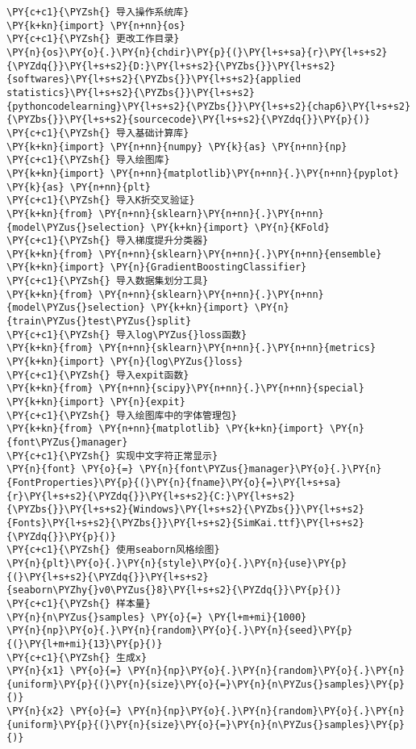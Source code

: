 \begin{Verbatim}[commandchars=\\\{\}]
\PY{c+c1}{\PYZsh{} 导入操作系统库}
\PY{k+kn}{import} \PY{n+nn}{os}
\PY{c+c1}{\PYZsh{} 更改工作目录}
\PY{n}{os}\PY{o}{.}\PY{n}{chdir}\PY{p}{(}\PY{l+s+sa}{r}\PY{l+s+s2}{\PYZdq{}}\PY{l+s+s2}{D:}\PY{l+s+s2}{\PYZbs{}}\PY{l+s+s2}{softwares}\PY{l+s+s2}{\PYZbs{}}\PY{l+s+s2}{applied statistics}\PY{l+s+s2}{\PYZbs{}}\PY{l+s+s2}{pythoncodelearning}\PY{l+s+s2}{\PYZbs{}}\PY{l+s+s2}{chap6}\PY{l+s+s2}{\PYZbs{}}\PY{l+s+s2}{sourcecode}\PY{l+s+s2}{\PYZdq{}}\PY{p}{)}
\PY{c+c1}{\PYZsh{} 导入基础计算库}
\PY{k+kn}{import} \PY{n+nn}{numpy} \PY{k}{as} \PY{n+nn}{np}
\PY{c+c1}{\PYZsh{} 导入绘图库}
\PY{k+kn}{import} \PY{n+nn}{matplotlib}\PY{n+nn}{.}\PY{n+nn}{pyplot} \PY{k}{as} \PY{n+nn}{plt}
\PY{c+c1}{\PYZsh{} 导入K折交叉验证}
\PY{k+kn}{from} \PY{n+nn}{sklearn}\PY{n+nn}{.}\PY{n+nn}{model\PYZus{}selection} \PY{k+kn}{import} \PY{n}{KFold}
\PY{c+c1}{\PYZsh{} 导入梯度提升分类器}
\PY{k+kn}{from} \PY{n+nn}{sklearn}\PY{n+nn}{.}\PY{n+nn}{ensemble} \PY{k+kn}{import} \PY{n}{GradientBoostingClassifier}
\PY{c+c1}{\PYZsh{} 导入数据集划分工具}
\PY{k+kn}{from} \PY{n+nn}{sklearn}\PY{n+nn}{.}\PY{n+nn}{model\PYZus{}selection} \PY{k+kn}{import} \PY{n}{train\PYZus{}test\PYZus{}split}
\PY{c+c1}{\PYZsh{} 导入log\PYZus{}loss函数}
\PY{k+kn}{from} \PY{n+nn}{sklearn}\PY{n+nn}{.}\PY{n+nn}{metrics} \PY{k+kn}{import} \PY{n}{log\PYZus{}loss}
\PY{c+c1}{\PYZsh{} 导入expit函数}
\PY{k+kn}{from} \PY{n+nn}{scipy}\PY{n+nn}{.}\PY{n+nn}{special} \PY{k+kn}{import} \PY{n}{expit}
\PY{c+c1}{\PYZsh{} 导入绘图库中的字体管理包}
\PY{k+kn}{from} \PY{n+nn}{matplotlib} \PY{k+kn}{import} \PY{n}{font\PYZus{}manager}
\PY{c+c1}{\PYZsh{} 实现中文字符正常显示}
\PY{n}{font} \PY{o}{=} \PY{n}{font\PYZus{}manager}\PY{o}{.}\PY{n}{FontProperties}\PY{p}{(}\PY{n}{fname}\PY{o}{=}\PY{l+s+sa}{r}\PY{l+s+s2}{\PYZdq{}}\PY{l+s+s2}{C:}\PY{l+s+s2}{\PYZbs{}}\PY{l+s+s2}{Windows}\PY{l+s+s2}{\PYZbs{}}\PY{l+s+s2}{Fonts}\PY{l+s+s2}{\PYZbs{}}\PY{l+s+s2}{SimKai.ttf}\PY{l+s+s2}{\PYZdq{}}\PY{p}{)}
\PY{c+c1}{\PYZsh{} 使用seaborn风格绘图}
\PY{n}{plt}\PY{o}{.}\PY{n}{style}\PY{o}{.}\PY{n}{use}\PY{p}{(}\PY{l+s+s2}{\PYZdq{}}\PY{l+s+s2}{seaborn\PYZhy{}v0\PYZus{}8}\PY{l+s+s2}{\PYZdq{}}\PY{p}{)}
\PY{c+c1}{\PYZsh{} 样本量}
\PY{n}{n\PYZus{}samples} \PY{o}{=} \PY{l+m+mi}{1000}
\PY{n}{np}\PY{o}{.}\PY{n}{random}\PY{o}{.}\PY{n}{seed}\PY{p}{(}\PY{l+m+mi}{13}\PY{p}{)}
\PY{c+c1}{\PYZsh{} 生成x}
\PY{n}{x1} \PY{o}{=} \PY{n}{np}\PY{o}{.}\PY{n}{random}\PY{o}{.}\PY{n}{uniform}\PY{p}{(}\PY{n}{size}\PY{o}{=}\PY{n}{n\PYZus{}samples}\PY{p}{)}
\PY{n}{x2} \PY{o}{=} \PY{n}{np}\PY{o}{.}\PY{n}{random}\PY{o}{.}\PY{n}{uniform}\PY{p}{(}\PY{n}{size}\PY{o}{=}\PY{n}{n\PYZus{}samples}\PY{p}{)}

\end{Verbatim}
